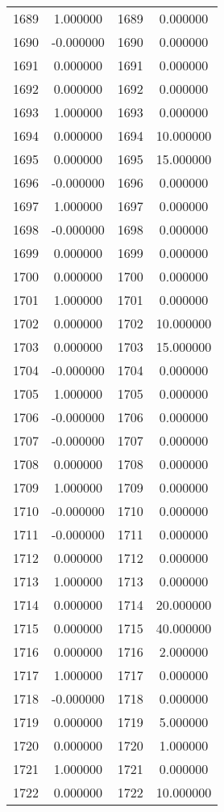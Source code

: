 \documentclass[12pt]{article}
\begin{document}
\begin{longtable}{@{}cccc@{}}
1689 & 1.000000 & 1689 & 0.000000 \\
1690 & -0.000000 & 1690 & 0.000000 \\
1691 & 0.000000 & 1691 & 0.000000 \\
1692 & 0.000000 & 1692 & 0.000000 \\
1693 & 1.000000 & 1693 & 0.000000 \\
1694 & 0.000000 & 1694 & 10.000000 \\
1695 & 0.000000 & 1695 & 15.000000 \\
1696 & -0.000000 & 1696 & 0.000000 \\
1697 & 1.000000 & 1697 & 0.000000 \\
1698 & -0.000000 & 1698 & 0.000000 \\
1699 & 0.000000 & 1699 & 0.000000 \\
1700 & 0.000000 & 1700 & 0.000000 \\
1701 & 1.000000 & 1701 & 0.000000 \\
1702 & 0.000000 & 1702 & 10.000000 \\
1703 & 0.000000 & 1703 & 15.000000 \\
1704 & -0.000000 & 1704 & 0.000000 \\
1705 & 1.000000 & 1705 & 0.000000 \\
1706 & -0.000000 & 1706 & 0.000000 \\
1707 & -0.000000 & 1707 & 0.000000 \\
1708 & 0.000000 & 1708 & 0.000000 \\
1709 & 1.000000 & 1709 & 0.000000 \\
1710 & -0.000000 & 1710 & 0.000000 \\
1711 & -0.000000 & 1711 & 0.000000 \\
1712 & 0.000000 & 1712 & 0.000000 \\
1713 & 1.000000 & 1713 & 0.000000 \\
1714 & 0.000000 & 1714 & 20.000000 \\
1715 & 0.000000 & 1715 & 40.000000 \\
1716 & 0.000000 & 1716 & 2.000000 \\
1717 & 1.000000 & 1717 & 0.000000 \\
1718 & -0.000000 & 1718 & 0.000000 \\
1719 & 0.000000 & 1719 & 5.000000 \\
1720 & 0.000000 & 1720 & 1.000000 \\
1721 & 1.000000 & 1721 & 0.000000 \\
1722 & 0.000000 & 1722 & 10.000000 \\

\end{longtable}
\end{document}
